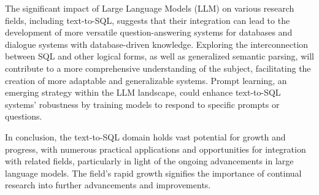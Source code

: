 The significant impact of Large Language Models (LLM) on various research fields, including text-to-SQL, suggests that their integration can lead to the development of more versatile question-answering systems for databases and dialogue systems with database-driven knowledge. Exploring the interconnection between SQL and other logical forms, as well as generalized semantic parsing, will contribute to a more comprehensive understanding of the subject, facilitating the creation of more adaptable and generalizable systems. Prompt learning, an emerging strategy within the LLM landscape, could enhance text-to-SQL systems' robustness by training models to respond to specific prompts or questions.

In conclusion, the text-to-SQL domain holds vast potential for growth and progress, with numerous practical applications and opportunities for integration with related fields, particularly in light of the ongoing advancements in large language models. The field's rapid growth signifies the importance of continual research into further advancements and improvements.





